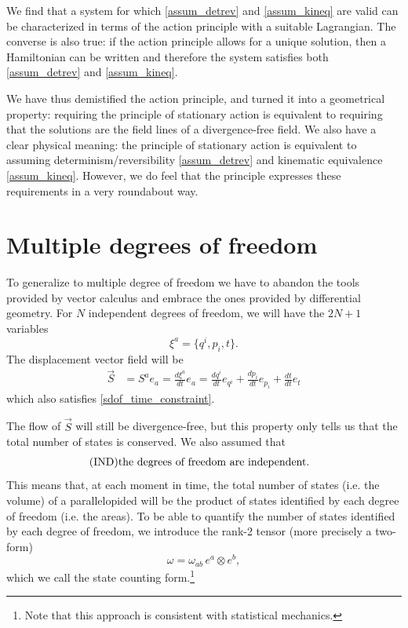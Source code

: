 \documentclass[10pt,twocolumn, nofootinbib]{revtex4-2}
\begin{document}
We find that a system for which \ref{assum_detrev} and \ref{assum_kineq} are valid can be characterized in terms of the action principle with a suitable Lagrangian. The converse is also true: if the action principle allows for a unique solution, then a Hamiltonian can be written and therefore the system satisfies both \ref{assum_detrev} and \ref{assum_kineq}.

We have thus demistified the action principle, and turned it into a geometrical property: requiring the principle of stationary action is equivalent to requiring that the solutions are the field lines of a divergence-free field. We also have a clear physical meaning: the principle of stationary action is equivalent to assuming determinism/reversibility \ref{assum_detrev} and kinematic equivalence \ref{assum_kineq}. However, we do feel that the principle expresses these requirements in a very roundabout way.

\section{Multiple degrees of freedom}

To generalize to multiple degree of freedom we have to abandon the tools provided by vector calculus and embrace the ones provided by differential geometry. For $N$ independent degrees of freedom, we will have the $2N+1$ variables
\begin{equation}\label{mdof_variables}
	\xi^a = \{ q^i, p_i, t\}.
\end{equation}
The displacement vector field will be
\begin{equation}\label{mdof_displacement}
	\begin{aligned}
		\vec{S} &= S^a e_a = \frac{d\xi^a}{dt} e_a =\frac{dq^i}{dt} e_{q^i} + \frac{dp_i}{dt} e_{p_i} + \frac{dt}{dt} e_t
	\end{aligned}
\end{equation}
which also satisfies \ref{sdof_time_constraint}.

The flow of $\vec{S}$ will still be divergence-free, but this property only tells us that the total number of states is conserved. We also assumed that
\begin{align}\label{assum_indep}
	\tag*{(IND)}
	\parbox{2.8in}{the degrees of freedom are independent.}
\end{align}
This means that, at each moment in time, the total number of states (i.e. the volume) of a parallelopided will be the product of states identified by each degree of freedom (i.e. the areas). To be able to quantify the number of states identified by each degree of freedom, we introduce the rank-2 tensor (more precisely a two-form)
\begin{equation}\label{mdof_form}
	\omega = \omega_{ab} \, e^a \otimes e^b,
\end{equation}
which we call the state counting form.\footnote{Note that this approach is consistent with statistical mechanics.}
\end{document}
